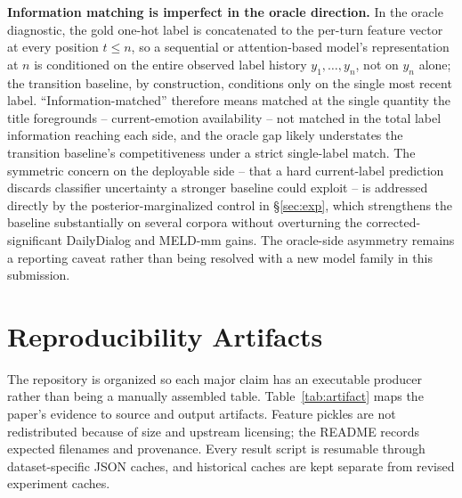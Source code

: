 \documentclass{ieeeaccess}
\begin{document}
\textbf{Information matching is imperfect in the oracle direction.} In the oracle diagnostic, the
gold one-hot label is concatenated to the per-turn feature vector at every position $t \le n$, so a
sequential or attention-based model's representation at $n$ is conditioned on the entire observed
label history $y_1,\ldots,y_n$, not on $y_n$ alone; the transition baseline, by construction,
conditions only on the single most recent label. ``Information-matched'' therefore means matched
at the single quantity the title foregrounds -- current-emotion availability -- not matched in
the total label information reaching each side, and the oracle gap likely understates the
transition baseline's competitiveness under a strict single-label match. The symmetric concern on
the deployable side -- that a hard current-label prediction discards classifier uncertainty a
stronger baseline could exploit -- is addressed directly by the posterior-marginalized control in
\S\ref{sec:exp}, which strengthens the baseline substantially on several corpora without
overturning the corrected-significant DailyDialog and MELD-mm gains. The oracle-side asymmetry
remains a reporting caveat rather than being resolved with a new model family in this submission.

\section{Reproducibility Artifacts}
\label{sec:artifact}

The repository is organized so each major claim has an executable producer rather than being a
manually assembled table. Table~\ref{tab:artifact} maps the paper's evidence to source and output
artifacts. Feature pickles are not redistributed because of size and upstream licensing; the
README records expected filenames and provenance. Every result script is resumable through
dataset-specific JSON caches, and historical caches are kept separate from revised experiment
caches.
\end{document}
